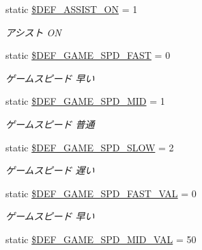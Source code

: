 \begin{DoxyCompactItemize}
static \hyperlink{class_reversi_const_ac486ec8951f7327db00d83e6c570cecb}{\$\+D\+E\+F\+\_\+\+A\+S\+S\+I\+S\+T\+\_\+\+ON} = 1
\begin{DoxyCompactList}\small\item\em アシスト ON \end{DoxyCompactList}\item 
\mbox{\label{class_reversi_const_a8c6962b66e74e00ea5a8d096d69990f9}} 
static \hyperlink{class_reversi_const_a8c6962b66e74e00ea5a8d096d69990f9}{\$\+D\+E\+F\+\_\+\+G\+A\+M\+E\+\_\+\+S\+P\+D\+\_\+\+F\+A\+ST} = 0
\begin{DoxyCompactList}\small\item\em ゲームスピード 早い \end{DoxyCompactList}\item 
\mbox{\label{class_reversi_const_a193b49bd2c83732144f045f9a50aa33e}} 
static \hyperlink{class_reversi_const_a193b49bd2c83732144f045f9a50aa33e}{\$\+D\+E\+F\+\_\+\+G\+A\+M\+E\+\_\+\+S\+P\+D\+\_\+\+M\+ID} = 1
\begin{DoxyCompactList}\small\item\em ゲームスピード 普通 \end{DoxyCompactList}\item 
\mbox{\label{class_reversi_const_a0b3dc06c436244edd6720ad50a6eb673}} 
static \hyperlink{class_reversi_const_a0b3dc06c436244edd6720ad50a6eb673}{\$\+D\+E\+F\+\_\+\+G\+A\+M\+E\+\_\+\+S\+P\+D\+\_\+\+S\+L\+OW} = 2
\begin{DoxyCompactList}\small\item\em ゲームスピード 遅い \end{DoxyCompactList}\item 
\mbox{\label{class_reversi_const_a482c8f8dd0e67619fda3f134ab0a011c}} 
static \hyperlink{class_reversi_const_a482c8f8dd0e67619fda3f134ab0a011c}{\$\+D\+E\+F\+\_\+\+G\+A\+M\+E\+\_\+\+S\+P\+D\+\_\+\+F\+A\+S\+T\+\_\+\+V\+AL} = 0
\begin{DoxyCompactList}\small\item\em ゲームスピード 早い \end{DoxyCompactList}\item 
\mbox{\label{class_reversi_const_ac370025cba197235c70bb8adf896adf8}} 
static \hyperlink{class_reversi_const_ac370025cba197235c70bb8adf896adf8}{\$\+D\+E\+F\+\_\+\+G\+A\+M\+E\+\_\+\+S\+P\+D\+\_\+\+M\+I\+D\+\_\+\+V\+AL} = 50

\end{DoxyCompactItemize}

